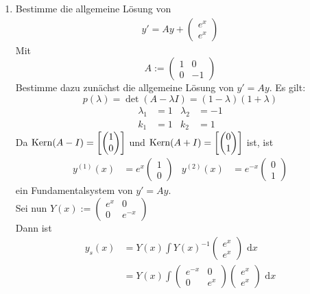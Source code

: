 \documentclass[a4paper,twoside,DIV15,BCOR12mm,chapterprefix=true,headings=twolinechapter]{scrbook}
\begin{document}
\begin{enumerate}
\item Bestimme die allgemeine Lösung von 
\begin{align*} 
\tag{$\ast $} y' = Ay + \begin{pmatrix} e^x \\ e^x \end{pmatrix}
\end{align*}
Mit
\[A:=\begin{pmatrix} 1 & 0 \\ 0 & -1 \end{pmatrix}\]
Bestimme dazu zunächst die allgemeine Lösung von $y' = Ay$. Es gilt: 
\[p(\lambda)=\det(A-\lambda I) = (1-\lambda)(1+\lambda)\]
\begin{align*}
\lambda_1 &= 1 &\lambda_2 &= -1\\
k_1&=1&k_2&=1
\end{align*}
Da $\mathop{\rm Kern}\nolimits(A-I) = \left[ \begin{pmatrix} 1 \\ 0 \end{pmatrix} \right]$ und 
$\mathop{\rm Kern}\nolimits(A+I) = \left[ \begin{pmatrix} 0 \\ 1 \end{pmatrix} \right]$ ist, ist
\begin{align*}
y^{(1)}(x) &= e^x \begin{pmatrix} 1 \\ 0 \end{pmatrix} 
&y^{(2)}(x) &= e^{-x} \begin{pmatrix} 0 \\ 1 \end{pmatrix}
\end{align*}
ein Fundamentalsystem von $y' = Ay$.\\
Sei nun $Y(x) := \begin{pmatrix} e^x & 0 \\ 0 & e^{-x} \end{pmatrix}$ \\ 
Dann ist
\begin{align*}
y_s(x) &= Y(x) \int Y(x)^{-1} \begin{pmatrix} e^x \\ e^x \end{pmatrix} \text{ d}x\\ 
&= Y(x) \int \begin{pmatrix} e^{-x} & 0 \\ 0 & e^x \end{pmatrix} \begin{pmatrix} e^x \\ e^x \end{pmatrix} \text{ d}x\\ 

\end{align*}
\end{enumerate}
\end{document}
